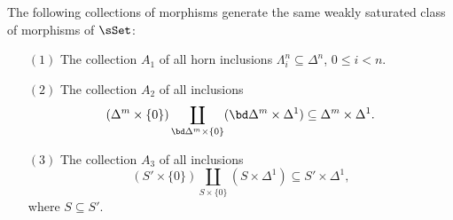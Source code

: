 \begin{proposition}\label{usejoyal}
The following collections  of morphisms generate the same weakly saturated class of morphisms
of $\sSet$:
\begin{itemize}
\item[$(1)$] The collection $A_1$ of all horn inclusions $\Lambda^n_i
\subseteq \Delta^n$, $0 \leq i < n$.

\item[$(2)$] The collection $A_2$ of all inclusions $$(\Delta^m \times
\{0\}) \coprod_{ \bd \Delta^m \times \{0\} } (\bd \Delta^m \times
\Delta^1) \subseteq \Delta^m \times \Delta^1.$$

\item[$(3)$] The collection $A_3$ of all inclusions $$(S' \times \{0\})
\coprod_{S \times \{0\} } (S \times \Delta^1) \subseteq S' \times
\Delta^1,$$ where $S \subseteq S'$.

\end{itemize}
\end{proposition}

